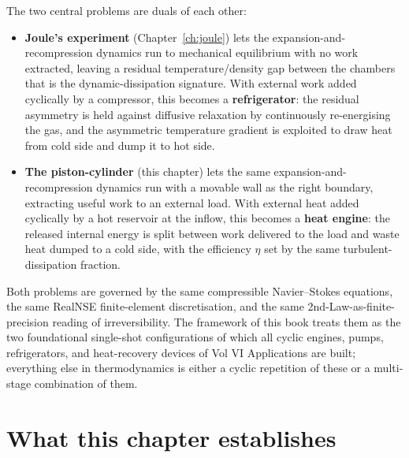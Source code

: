 The two central problems are duals of each other:
\begin{itemize}
\item \textbf{Joule's experiment} (Chapter~\ref{ch:joule}) lets the
expansion-and-recompression dynamics run to mechanical equilibrium
with no work extracted, leaving a residual temperature/density gap
between the chambers that is the dynamic-dissipation signature. With
external work added cyclically by a compressor, this becomes a
\textbf{refrigerator}: the residual asymmetry is held against
diffusive relaxation by continuously re-energising the gas, and the
asymmetric temperature gradient is exploited to draw heat from cold
side and dump it to hot side.

\item \textbf{The piston-cylinder} (this chapter) lets the same
expansion-and-recompression dynamics run with a movable wall as the
right boundary, extracting useful work to an external load. With
external heat added cyclically by a hot reservoir at the inflow, this
becomes a \textbf{heat engine}: the released internal energy is split
between work delivered to the load and waste heat dumped to a cold
side, with the efficiency $\eta$ set by the same turbulent-dissipation
fraction.
\end{itemize}
Both problems are governed by the same compressible
Navier--Stokes equations, the same RealNSE finite-element discretisation,
and the same 2nd-Law-as-finite-precision reading of irreversibility.
The framework of this book treats them as the two foundational
single-shot configurations of which all cyclic engines, pumps,
refrigerators, and heat-recovery devices of Vol VI Applications are
built; everything else in thermodynamics is either a cyclic repetition
of these or a multi-stage combination of them.

\section{What this chapter establishes}


